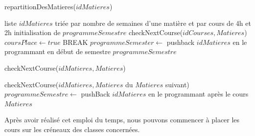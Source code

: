 \begin{algorithm}
\caption{repartitionDesMatieres($idMatieres$)}
\begin {algorithmic}
\REQUIRE liste $idMatieres$ triée par nombre de semaines d'une matière et par cours de 4h et 2h
\STATE initialisation de $programmeSemestre$
\STATE checkNextCourse($idCourses, Matieres$)
\STATE $coursPlace \leftarrow true$
\STATE BREAK
\ENDIF
\ENDIF
\ENDFOR
{}
\STATE $programmeSemester \leftarrow$ pushback $idMatieres$ en le programmant en début de semestre
\ENDIF
\ENDFOR
\RETURN $programmeSemestre$
\end{algorithmic}
\end{algorithm}


\newpage

\begin{algorithm}
\caption{checkNextCourse($idMatieres, Matieres$)}
\begin {algorithmic}
\STATE checkNextCourse($idMatieres, Matieres$ du $Matieres$ suivant)
\STATE $programmeSemestre \leftarrow$ pushBack $idMatieres$ en le programmant après le cours $Matieres$
\ENDIF
\end{algorithmic}
\end{algorithm}

Après avoir réalisé cet emploi du temps, nous pouvons commencer à placer les cours sur les créneaux des classes concernées.


